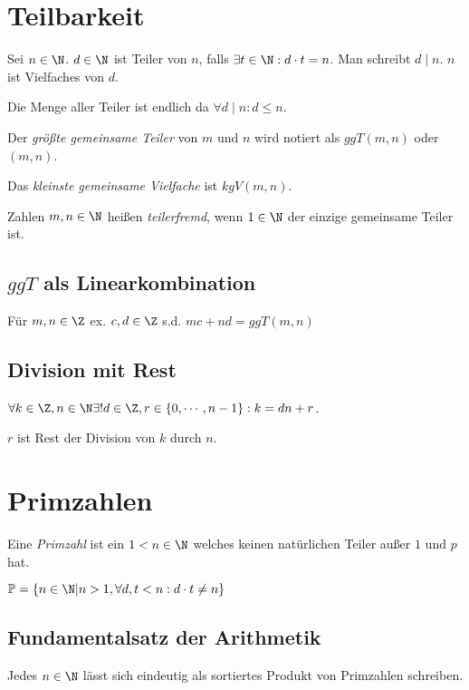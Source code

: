 \newcommand{\Primes}{\mathbb{P}}

\section*{Teilbarkeit}

Sei $n \in \N$. $d \in \N$ ist Teiler von $n$, falls $\exists t \in \N : d \cdot t = n$. Man schreibt $d \mid n$. $n$ ist Vielfaches von $d$.

Die Menge aller Teiler ist endlich da $\forall d \mid n : d \leq n$.

Der \emph{größte gemeinsame Teiler} von $m$ und $n$ wird notiert als $ggT(m,n)$ oder $(m,n)$.

Das \emph{kleinste gemeinsame Vielfache} ist $kgV(m,n)$.

Zahlen $m, n \in \N$ heißen \emph{teilerfremd}, wenn $1 \in \N$ der einzige gemeinsame Teiler ist.

\subsection*{$ggT$ als Linearkombination}

Für $m, n \in \Z$ ex. $c, d \in \Z$ s.d. $mc + nd = ggT(m,n)$

\subsection*{Division mit Rest}

$\forall k \in \Z, n \in \N \exists! d \in \Z, r \in \{0,\cdots,n-1\}: k = dn+r$.

$r$ ist Rest der Division von $k$ durch $n$.

\section*{Primzahlen}

Eine \emph{Primzahl} ist ein $1 < n \in \N$ welches keinen natürlichen Teiler außer $1$ und $p$ hat.

$\Primes = \{ n \in \N | n > 1, \forall d,t < n : d \cdot t \neq n \}$

\subsection*{Fundamentalsatz der Arithmetik}

Jedes $n \in \N$ lässt sich eindeutig als sortiertes Produkt von Primzahlen schreiben.

